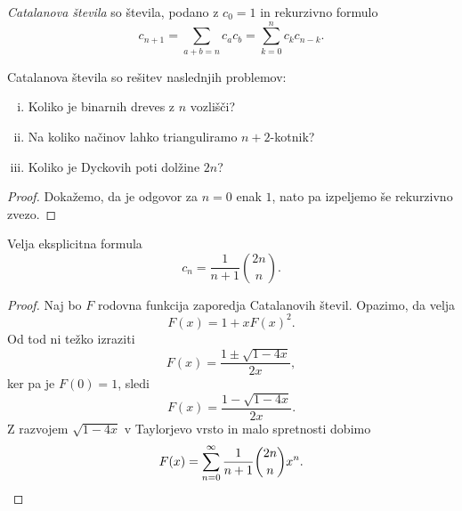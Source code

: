 \begin{definicija}
\emph{Catalanova števila} so števila,
podano z $c_0 = 1$ in rekurzivno formulo
\[
c_{n+1} = \sum_{a+b=n} c_a c_b = \sum_{k=0}^n c_k c_{n-k}.
\]
\end{definicija}

\begin{trditev}
Catalanova števila so rešitev naslednjih problemov:

\begin{enumerate}[i)]
\item Koliko je binarnih dreves z $n$ vozlišči?
\item Na koliko načinov lahko trianguliramo $n+2$-kotnik?
\item Koliko je Dyckovih poti dolžine $2n$?
\end{enumerate}
\end{trditev}

\begin{proof}
Dokažemo, da je odgovor za $n=0$ enak $1$, nato pa izpeljemo še
rekurzivno zvezo.
\end{proof}

\begin{izrek}
Velja eksplicitna formula
\[
c_n = \frac{1}{n+1} \binom{2n}{n}.
\]
\end{izrek}

\begin{proof}
Naj bo $F$ rodovna funkcija zaporedja Catalanovih števil. Opazimo,
da velja
\[
F(x) = 1 + x F(x)^2.
\]
Od tod ni težko izraziti
\[
F(x) = \frac{1 \pm \sqrt{1-4x}}{2x},
\]
ker pa je $F(0) = 1$, sledi
\[
F(x) = \frac{1 - \sqrt{1-4x}}{2x}.
\]
Z razvojem $\sqrt{1-4x}$ v Taylorjevo vrsto in malo spretnosti
dobimo
\[
F(x) = \sum_{n=0}^\infty \frac{1}{n+1} \binom{2n}{n} x^n. \qedhere
\]
\end{proof}

